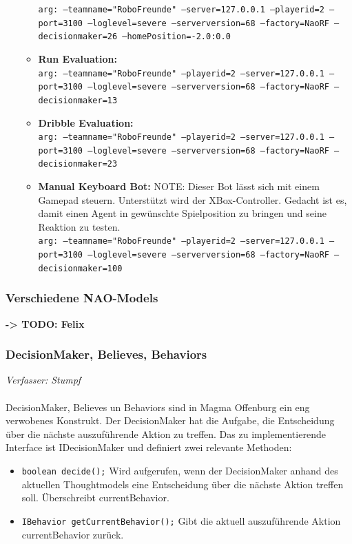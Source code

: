 \documentclass[fontsize=12pt,a4paper,final]{scrartcl}[2003/01/01]
\begin{document}
\begin{itemize}
\begin{itemize}
\texttt{arg: --teamname="RoboFreunde" --server=127.0.0.1 --playerid=2 --port=3100 --loglevel=severe --serverversion=68 --factory=NaoRF --decisionmaker=26 --homePosition=-2.0:0.0}
	\item \textbf{Run Evaluation:}\\
\texttt{arg: --teamname="RoboFreunde" --playerid=2 --server=127.0.0.1  --port=3100 --loglevel=severe --serverversion=68 --factory=NaoRF --decisionmaker=13}
	\item \textbf{Dribble Evaluation:}\\
\texttt{arg: --teamname="RoboFreunde" --playerid=2 --server=127.0.0.1  --port=3100 --loglevel=severe --serverversion=68 --factory=NaoRF --decisionmaker=23}
	\item \textbf{Manual Keyboard Bot:} NOTE: Dieser Bot lässt sich mit einem Gamepad steuern. Unterstützt wird der XBox-Controller. Gedacht ist es, damit einen Agent in gewünschte Spielposition zu bringen und seine Reaktion zu testen.\\
\texttt{arg: --teamname="RoboFreunde" --playerid=2 --server=127.0.0.1  --port=3100 --loglevel=severe --serverversion=68 --factory=NaoRF --decisionmaker=100}
	\end{itemize}
\end{itemize}

\subsubsection{Verschiedene NAO-Models}
\textbf{-> TODO: Felix}

\subsubsection{DecisionMaker, Believes, Behaviors} \label{sse:decisionmaker-belives-behaviors}
\textit{Verfasser: Stumpf}\\
\\
DecisionMaker, Believes un Behaviors sind in Magma Offenburg ein eng verwobenes Konstrukt. Der DecisionMaker hat die Aufgabe, die Entscheidung über die nächste auszuführende Aktion zu treffen. Das zu implementierende Interface ist IDecisionMaker und definiert zwei relevante Methoden:
\begin{itemize}
\item \texttt{boolean decide();} Wird aufgerufen, wenn der DecisionMaker anhand des aktuellen Thoughtmodels eine Entscheidung über die nächste Aktion treffen soll. Überschreibt currentBehavior.
\item \texttt{IBehavior getCurrentBehavior();} Gibt die aktuell auszuführende Aktion currentBehavior zurück.
\end{itemize}
\end{document}
